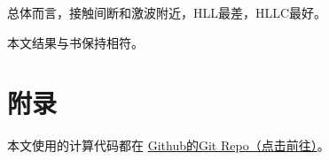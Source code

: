 \documentclass[UTF8,zihao=5]{ctexart} %
\begin{document}
总体而言，接触间断和激波附近，HLL最差，HLLC最好。


本文结果与书\cite{2013Riemann}保持相符。

{}



\section*{附录}

本文使用的计算代码都在
\href{https://github.com/harryzhou2000/HW_ACFD}{Github的Git Repo（点击前往）}。



























\end{document}
